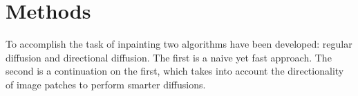 \section{Methods}
\label{sec:methods}

To accomplish the task of inpainting two algorithms have been developed: regular diffusion and directional diffusion. The first is a naive yet fast approach. The second is a continuation on the first, which takes into account the directionality of image patches to perform smarter diffusions.



